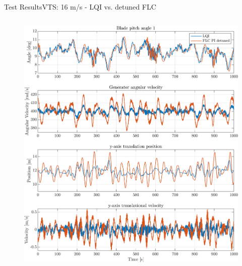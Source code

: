 \begin{frame}{Test Results}{VTS: 16 m/s - LQI vs. detuned FLC}
\begin{columns}
		\begin{column}{.75\linewidth}
			\begin{figure}[h]
				\centering
				\includegraphics[width=0.9\linewidth]{../Graphics/TestResults/VTSplotting/10_th_w_py_vy.png}
				\label{fig:vts_10_th_w_py_vy}
			\end{figure}
		\end{column}
	\end{columns}	
	
	
\end{frame}


